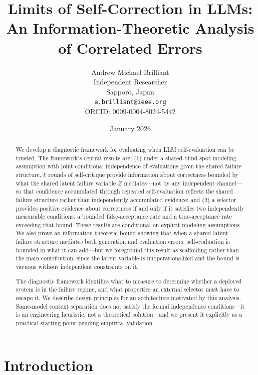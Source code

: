 \documentclass[11pt]{article}
\title{Limits of Self-Correction in LLMs:\\
\large An Information-Theoretic Analysis of Correlated Errors}
\author{Andrew Michael Brilliant\\
Independent Researcher\\
Sapporo, Japan\\
\texttt{a.brilliant@ieee.org}\\
ORCID: 0009-0004-8024-5442}
\date{January 2026}
\begin{document}
\maketitle

\begin{abstract}
We develop a diagnostic framework for evaluating when LLM self-evaluation can be trusted.
The framework's central results are: (1) under a shared-blind-spot modeling assumption with
joint conditional independence of evaluations given the shared failure structure, $k$ rounds
of self-critique provide information about correctness bounded by what the shared latent
failure variable $Z$ mediates---not by any independent channel---so that confidence
accumulated through repeated self-evaluation reflects the shared failure structure rather
than independently accumulated evidence; and (2) a selector provides positive evidence
about correctness if and only if it satisfies two independently measurable conditions: a
bounded false-acceptance rate and a true-acceptance rate exceeding that bound. These results
are conditional on explicit modeling assumptions. We also prove an information-theoretic
bound showing that when a shared latent failure structure mediates both generation and
evaluation errors, self-evaluation is bounded in what it can add---but we foreground this
result as scaffolding rather than the main contribution, since the latent variable is
unoperationalized and the bound is vacuous without independent constraints on it.

The diagnostic framework identifies what to measure to determine whether a deployed
system is in the failure regime, and what properties an external selector must have to
escape it. We describe design principles for an architecture motivated by this analysis.
Same-model context separation does not satisfy the formal independence conditions---it
is an engineering heuristic, not a theoretical solution---and we present it explicitly
as a practical starting point pending empirical validation.
\end{abstract}

\tableofcontents
\newpage

\section{Introduction}
\end{document}
